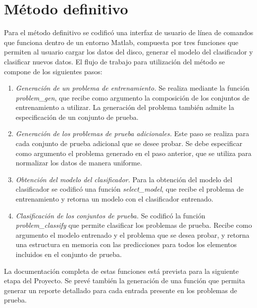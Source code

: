 \documentclass[12pt,bibliography=oldstyle,DIV=12,parskip=half-,titlepage]{scrartcl}
\begin{document}
%
%
\section{Método definitivo}
%
Para el método definitivo se codificó una interfaz de usuario de línea
de comandos que funciona dentro de un entorno Matlab, compuesta por
tres funciones que permiten al usuario cargar los datos del disco,
generar el modelo del clasificador y clasificar nuevos datos.
El flujo de trabajo para utilización del método se compone de los siguientes pasos:
\begin{enumerate}
\item \emph{Generación de un problema de entrenamiento.}
  Se realiza mediante la función \emph{problem\_gen}, que recibe como
  argumento la composición de los conjuntos de entrenamiento a utilizar.
  La generación del problema también admite la especificación de un
  conjunto de prueba.
\item \emph{Generación de los problemas de prueba adicionales.}
  Este paso se realiza para cada conjunto de prueba adicional que
  se desee probar. Se debe especificar como argumento el problema generado
  en el paso anterior, que se utiliza para normalizar los datos
  de manera uniforme.
\item \emph{Obtención del modelo del clasificador.}
  Para la obtención del modelo del clasificador se codificó una función
  \emph{select\_model}, que recibe el problema de entrenamiento y retorna
  un modelo con el clasificador entrenado.
\item \emph{Clasificación de los conjuntos de prueba.}
  Se codificó la función \emph{problem\_classify} que permite
  clasificar los problemas de prueba. Recibe como argumento el modelo
  entrenado y el problema que se desea probar, y retorna una
  estructura en memoria con las predicciones para todos los elementos
  incluidos en el conjunto de prueba.
\end{enumerate}
La documentación completa de estas funciones está prevista para la
siguiente etapa del Proyecto. Se prevé también la generación de una
función que permita generar un reporte detallado para cada entrada
presente en los problemas de prueba.
\end{document}
